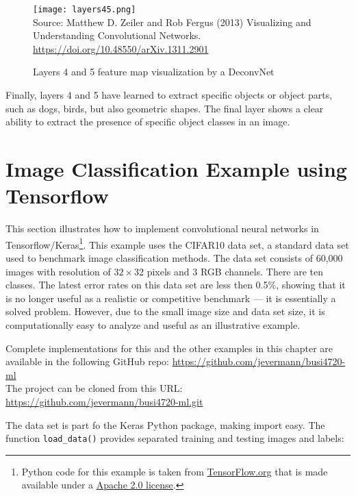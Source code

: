 \begin{figure}
\centering
\texttt{[image: layers45.png]} \\
\vspace{0.5\baselineskip}
\scriptsize Source: Matthew D. Zeiler and Rob Fergus (2013) Visualizing and Understanding Convolutional Networks. \url{https://doi.org/10.48550/arXiv.1311.2901}
\caption{Layers 4 and 5 feature map visualization by a DeconvNet}
\label{fig:layer45}
\end{figure}

Finally, layers 4 and 5 have learned to extract specific objects or object parts, such as dogs, birds, but also geometric shapes. The final layer shows a clear ability to extract the presence of specific object classes in an image. 

\FloatBarrier

\section{Image Classification Example using Tensorflow}

This section illustrates how to implement convolutional neural networks in Tensorflow/Keras\footnote{Python code for this example is taken from \href{https://www.tensorflow.org/tutorials/images/cnn}{TensorFlow.org} that is made available under a \href{https://www.apache.org/licenses/LICENSE-2.0}{Apache 2.0 license}.}. This example uses the CIFAR10 data set, a standard data set used to benchmark image classification methods. The data set consists of 60,000 images with resolution of $32 \times 32$ pixels and 3 RGB channels. There are ten classes. The latest error rates on this data set are less then 0.5\%, showing that it is no longer useful as a realistic or competitive benchmark --- it is essentially a solved problem. However, due to the small image size and data set size, it is computationally easy to analyze and useful as an illustrative example. 

\begin{resourcebox}
Complete implementations for this and the other examples in this chapter are available in the following GitHub repo:
\small\url{https://github.com/jevermann/busi4720-ml}\normalsize \\

The project can be cloned from this URL: \small\url{https://github.com/jevermann/busi4720-ml.git}\normalsize
\end{resourcebox}

The data set is part fo the Keras Python package, making import easy. The function \texttt{load\_data()} provides separated training and testing images and labels:

